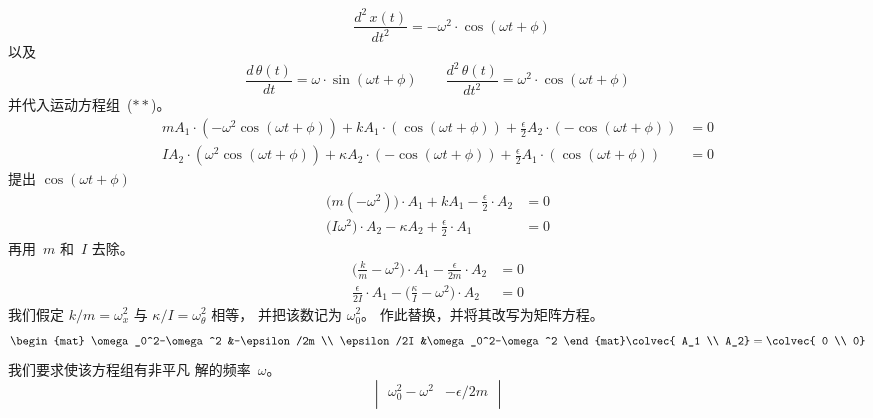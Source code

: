 \begin{exercises}
\begin{answer}
\begin{equation*}
      \qquad
      \frac{d^2\,x(t)}{dt^2}=-\omega^2\cdot\cos(\omega t+\phi)
    \end{equation*}
    以及
    \begin{equation*}
      \frac{d\,\theta(t)}{dt}=\omega\cdot\sin(\omega t+\phi)
      \qquad
      \frac{d^2\,\theta(t)}{dt^2}=\omega^2\cdot\cos(\omega t+\phi)
    \end{equation*}
    并代入运动方程组~($**$)。
    \begin{align*}
      mA_1\cdot(-\omega^2\cos(\omega t+\phi))
          +kA_1\cdot (\cos(\omega t+\phi))
          +\frac{\epsilon}{2}A_2\cdot (-\cos(\omega t+\phi)) 
          &=0  \\
      IA_2\cdot(\omega^2\cos(\omega t+\phi))
          +\kappa A_2\cdot (-\cos(\omega t+\phi))
          +\frac{\epsilon}{2}A_1\cdot (\cos(\omega t+\phi))  
          &=0  
    \end{align*}
    提出 $\cos(\omega t+\phi)$
    \begin{align*}
     \big(m(-\omega^2)\big)\cdot A_1
         +kA_1 
         -\frac{\epsilon}{2}\cdot A_2 
         &=0  \\
     \big(I\omega^2\big)\cdot A_2
         -\kappa A_2
         +\frac{\epsilon}{2}\cdot A_1  
         &=0  
   \end{align*}
   再用~$m$ 和~$I$ 去除。
   \begin{align*}
    \big(\frac{k}{m}-\omega^2\big)\cdot A_1 
        -\frac{\epsilon}{2m}\cdot A_2 
        &=0  \\
    \frac{\epsilon}{2I}\cdot A_1  
    -\big(\frac{\kappa}{I}-\omega^2\big)\cdot A_2
        &=0  
  \end{align*}
   我们假定 $k/m=\omega_{x}^2$
   与 $\kappa/I=\omega_{\theta}^2$ 相等，
   并把该数记为 $\omega_0^2$。
   作此替换，并将其改写为矩阵方程。
   \begin{equation*}
     \begin{mat}
       \omega_0^2-\omega^2    &-\epsilon/2m  \\
       \epsilon/2I &\omega_0^2-\omega^2 
     \end{mat}
     \colvec{
       A_1 \\
       A_2}
     =
     \colvec{
       0 \\
       0}
   \end{equation*}
   我们要求使该方程组有非平凡
   解的频率~$\omega$。
   \begin{equation*}
      \begin{vmatrix}
       \omega_0^2-\omega^2    &-\epsilon/2m  \\

\end{vmatrix}
\end{equation*}
\end{answer}
\end{exercises}
